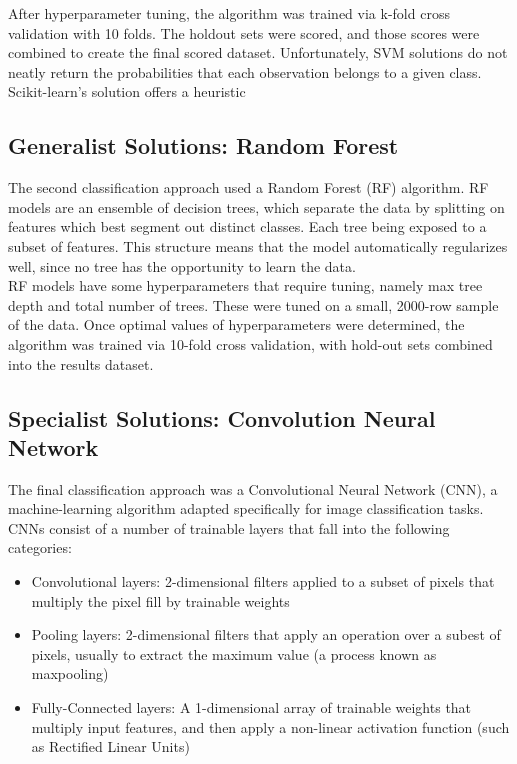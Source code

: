 \documentclass[11pt]{article}
\begin{document}
After hyperparameter tuning, the algorithm was trained via k-fold cross validation with 10 folds. The holdout sets were scored, and those scores were combined to create the final scored dataset. Unfortunately, SVM solutions do not neatly return the probabilities that each observation belongs to a given class. Scikit-learn's solution offers a heuristic


\subsection{Generalist Solutions: Random Forest}
The second classification approach used a Random Forest (RF) algorithm. RF models are an ensemble of decision trees, which separate the data by splitting on features which best segment out distinct classes. Each tree being exposed to a subset of features. This structure means that the model automatically regularizes well, since no tree has the opportunity to learn the data. \\

RF models have some hyperparameters that require tuning, namely max tree depth and total number of trees. These were tuned on a small, 2000-row sample of the data. Once optimal values of hyperparameters were determined, the algorithm was trained via 10-fold cross validation, with hold-out sets combined into the results dataset.

\subsection{Specialist Solutions: Convolution Neural Network}
The final classification approach was a Convolutional Neural Network (CNN), a machine-learning algorithm adapted specifically for image classification tasks. CNNs consist of a number of trainable layers that fall into the following categories:
\begin{itemize}
  \item Convolutional layers: 2-dimensional filters applied to a subset of pixels that multiply the pixel fill by trainable weights
  \item Pooling layers: 2-dimensional filters that apply an operation over a subest of pixels, usually to extract the maximum value (a process known as maxpooling)
  \item Fully-Connected layers: A 1-dimensional array of trainable weights that multiply input features, and then apply a non-linear activation function (such as Rectified Linear Units)
\end{itemize}
\end{document}
